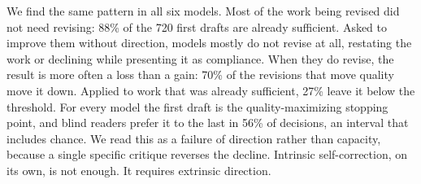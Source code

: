 We find the same pattern in all six models. Most of the work being revised did not need
revising: 88\% of the 720 first drafts are already sufficient. Asked to improve them
without direction, models mostly do not revise at all, restating the work or declining
while presenting it as compliance. When they do revise, the result is more often a loss
than a gain: 70\% of the revisions that move quality move it down. Applied to work that
was already sufficient, 27\% leave it below the threshold. For every model the first draft
is the quality-maximizing stopping point, and blind readers prefer it to the last in 56\%
of decisions, an interval that includes chance. We read this as a failure of direction
rather than capacity, because a single specific critique reverses the decline. Intrinsic
self-correction, on its own, is not enough. It requires extrinsic direction.
